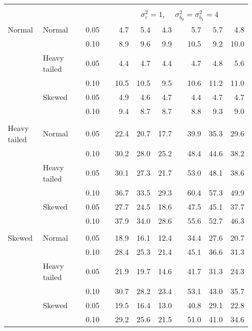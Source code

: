 \begin{table}[ht]
\begin{scriptsize}
\begin{tabular}{ll p{.1cm} c p{.1cm} rrr p{.1cm} rrr}
&&&&&&&&&&&\\
& && && \multicolumn{7}{c}{$\sigma_{\varepsilon}^2 = 1$, \ \ $\sigma_{b_0}^2 = \sigma_{b_1}^2 = 4$} \\ \cline{6-12}
\rowcolor{gray!20} Normal & Normal &  & 0.05 &  & 4.7 & 5.4 & 4.3 &  & 5.7 & 5.7 & 4.8 \\ 
\rowcolor{gray!20}    &  &  & 0.10 &  & 8.9 & 9.6 & 9.9 &  & 10.5 & 9.2 & 10.0 \\ 
\rowcolor{gray!20}    & Heavy tailed &  & 0.05 &  & 4.4 & 4.7 & 4.4 &  & 4.7 & 4.8 & 5.6 \\ 
\rowcolor{gray!20}    &  &  & 0.10 &  & 10.5 & 10.5 & 9.5 &  & 10.6 & 11.2 & 11.0 \\ 
\rowcolor{gray!20}    & Skewed &  & 0.05 &  & 4.9 & 4.6 & 4.7 &  & 4.4 & 4.7 & 4.7 \\ 
\rowcolor{gray!20}    &  &  & 0.10 &  & 9.4 & 8.7 & 8.7 &  & 8.8 & 9.3 & 9.0 \\ 
&&&&&&&&&&&\\
  Heavy tailed & Normal &  & 0.05 &  & 22.4 & 20.7 & 17.7 &  & 39.9 & 35.3 & 29.6 \\ 
  &  &  & 0.10 &  & 30.2 & 28.0 & 25.2 &  & 48.4 & 44.6 & 38.2 \\ 
  & Heavy tailed &  & 0.05 &  & 30.1 & 27.3 & 21.7 &  & 53.0 & 48.1 & 38.6 \\ 
  &  &  & 0.10 &  & 36.7 & 33.5 & 29.3 &  & 60.4 & 57.3 & 49.9 \\ 
  & Skewed &  & 0.05 &  & 27.7 & 24.5 & 18.6 &  & 47.5 & 45.1 & 37.7 \\ 
  &  &  & 0.10 &  & 37.9 & 34.0 & 28.6 &  & 55.6 & 52.7 & 46.3 \\ 
&&&&&&&&&&&\\
  Skewed & Normal &  & 0.05 &  & 18.9 & 16.1 & 12.4 &  & 34.4 & 27.6 & 20.7 \\ 
   &  &  & 0.10 &  & 28.4 & 25.3 & 21.4 &  & 45.1 & 36.6 & 31.3 \\ 
   & Heavy tailed &  & 0.05 &  & 21.9 & 19.7 & 14.6 &  & 41.7 & 31.3 & 24.3 \\ 
   &  &  & 0.10 &  & 30.7 & 28.2 & 23.4 &  & 53.1 & 43.0 & 35.7 \\ 
   & Skewed &  & 0.05 &  & 19.5 & 16.4 & 13.0 &  & 40.8 & 29.1 & 22.8 \\ 
   &  &  & 0.10 &  & 29.2 & 25.6 & 21.5 &  & 51.0 & 41.0 & 34.6 \\ 

\hline
\end{tabular}
\end{scriptsize}
\end{table}




